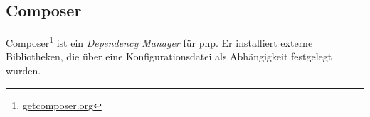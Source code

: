 \subsection{Composer}
Composer\footnote{\url{getcomposer.org}} ist ein \textit{Dependency Manager} für \gls{php}. Er installiert externe Bibliotheken, die über eine Konfigurationsdatei als Abhängigkeit festgelegt wurden.









